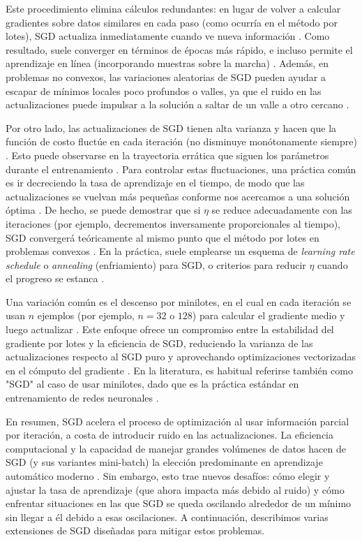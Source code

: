 \documentclass[12pt, spanish]{article}
\begin{document}
Este procedimiento elimina cálculos redundantes: en lugar de volver a calcular gradientes sobre datos similares en cada paso (como ocurría en el método por lotes), SGD actualiza inmediatamente cuando ve nueva información \cite{ref7}. Como resultado, suele converger en términos de épocas más rápido, e incluso permite el aprendizaje en línea (incorporando muestras sobre la marcha) \cite{ref1}. Además, en problemas no convexos, las variaciones aleatorias de SGD pueden ayudar a escapar de mínimos locales poco profundos o valles, ya que el ruido en las actualizaciones puede impulsar a la solución a saltar de un valle a otro cercano \cite{ref9}.

Por otro lado, las actualizaciones de SGD tienen alta varianza y hacen que la función de costo fluctúe en cada iteración (no disminuye monótonamente siempre) \cite{ref1}. Esto puede observarse en la trayectoria errática que siguen los parámetros durante el entrenamiento \cite{ref1}. Para controlar estas fluctuaciones, una práctica común es ir decreciendo la tasa de aprendizaje en el tiempo, de modo que las actualizaciones se vuelvan más pequeñas conforme nos acercamos a una solución óptima \cite{ref1}. De hecho, se puede demostrar que si $\eta$ se reduce adecuadamente con las iteraciones (por ejemplo, decrementos inversamente proporcionales al tiempo), SGD convergerá teóricamente al mismo punto que el método por lotes en problemas convexos \cite{ref1}. En la práctica, suele emplearse un esquema de \textit{learning rate schedule} o \textit{annealing} (enfriamiento) para SGD, o criterios para reducir $\eta$ cuando el progreso se estanca \cite{ref1}.

Una variación común es el descenso por minilotes, en el cual en cada iteración se usan $n$ ejemplos (por ejemplo, $n=32$ o $128$) para calcular el gradiente medio y luego actualizar \cite{ref1}. Este enfoque ofrece un compromiso entre la estabilidad del gradiente por lotes y la eficiencia de SGD, reduciendo la varianza de las actualizaciones respecto al SGD puro y aprovechando optimizaciones vectorizadas en el cómputo del gradiente \cite{ref1}. En la literatura, es habitual referirse también como "SGD" al caso de usar minilotes, dado que es la práctica estándar en entrenamiento de redes neuronales \cite{ref10}.

En resumen, SGD acelera el proceso de optimización al usar información parcial por iteración, a costa de introducir ruido en las actualizaciones. La eficiencia computacional y la capacidad de manejar grandes volúmenes de datos hacen de SGD (y sus variantes mini-batch) la elección predominante en aprendizaje automático moderno \cite{ref1}. Sin embargo, esto trae nuevos desafíos: cómo elegir y ajustar la tasa de aprendizaje (que ahora impacta más debido al ruido) y cómo enfrentar situaciones en las que SGD se queda oscilando alrededor de un mínimo sin llegar a él debido a esas oscilaciones. A continuación, describimos varias extensiones de SGD diseñadas para mitigar estos problemas.
\end{document}
